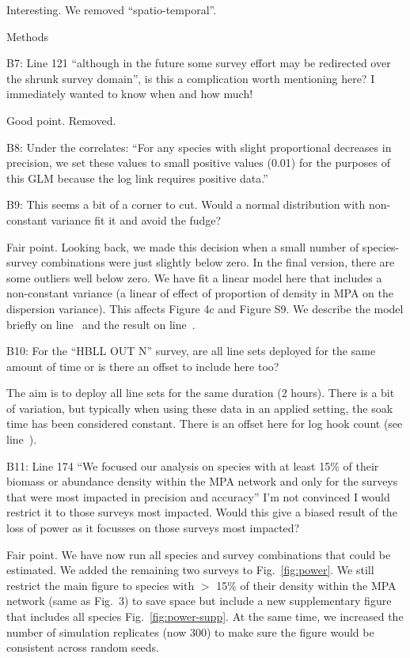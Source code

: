 \documentclass[12pt]{article}
\newcommand{\rev}[1]{{\color{niceblue} #1}}
\newcommand{\lr}[1]{line~\lineref{#1}}
\begin{document}
Interesting. We removed ``spatio-temporal''.

\rev{Methods}

\rev{B7: Line 121 “although in the future some survey effort may be redirected over the
shrunk survey domain”, is this a complication worth mentioning here?
I immediately wanted to know when and how much!}

Good point. Removed.

\rev{B8: Under the correlates: “For any species with slight proportional decreases in precision, we set these values to small positive values (0.01) for the purposes of this GLM because the log link requires positive data.”}

\rev{B9: This seems a bit of a corner to cut. Would a normal distribution with non-constant variance fit it and avoid the fudge?}

Fair point. Looking back, we made this decision when a small number of species-survey combinations were just slightly below zero. In the final version, there are some outliers well below zero. We have fit a linear model here that includes a non-constant variance (a linear of effect of proportion of density in MPA on the  dispersion variance). This affects Figure 4c and Figure S9. We describe the model briefly on \lr{B9a} and the result on \lr{B9b}.

\rev{B10: For the “HBLL OUT N” survey, are all line sets deployed for the same amount of
time or is there an offset to include here too?}

The aim is to deploy all line sets for the same duration (2 hours). There is a bit of variation, but typically when using these data in an applied setting, the soak time has been considered constant. There is an offset here for log hook count (see \lr{B10}).

\rev{B11: Line 174 “We focused our analysis on species with at least 15\% of their biomass or abundance density within the MPA network and only for the surveys that were most impacted in precision and accuracy” I'm not convinced I would restrict it to those surveys most impacted. Would this give a biased result of the loss of power as it focusses on those surveys most impacted?}

Fair point. We have now run all species and survey combinations that could be estimated. We added the remaining two surveys to Fig.~\ref{fig:power}. We still restrict the main figure to species with $>$ 15\% of their density within the MPA network (same as Fig.~3) to save space but include a new supplementary figure that includes all species Fig.~\ref{fig:power-supp}. At the same time, we increased the number of simulation replicates (now 300) to make sure the figure would be consistent across random seeds.
\end{document}
